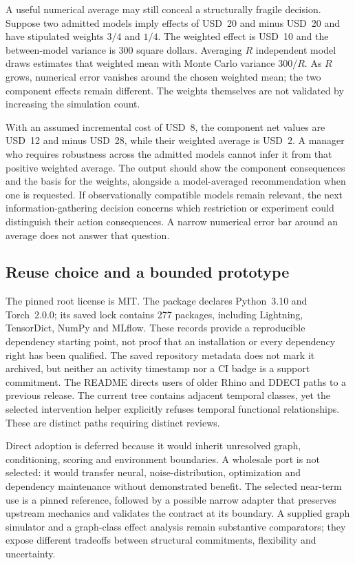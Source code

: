 A useful numerical average may still conceal a structurally fragile decision.
Suppose two admitted models imply effects of USD~20 and minus USD~20 and have
stipulated weights \(3/4\) and \(1/4\). The weighted effect is USD~10 and the
between-model variance is \(300\) square dollars. Averaging \(R\) independent
model draws estimates that weighted mean with Monte Carlo variance \(300/R\).
As \(R\) grows, numerical error vanishes around the chosen weighted mean;
the two component effects remain different. The weights themselves are not
validated by increasing the simulation count. \citep{exec14_causica_exact}

With an assumed incremental cost of USD~8, the component net values are
USD~12 and minus USD~28, while their weighted average is USD~2. A manager who
requires robustness across the admitted models cannot infer it from that
positive weighted average. The output should show the component consequences
and the basis for the weights, alongside a model-averaged recommendation
when one is requested. If observationally compatible models remain relevant,
the next information-gathering decision concerns which restriction or
experiment could distinguish their action consequences. A narrow numerical
error bar around an average does not answer that question.
\citep{exec14_causica_exact,exec14_causica_decision}

\subsection{Reuse choice and a bounded prototype}

The pinned root license is MIT. The package declares Python~3.10 and
Torch~2.0.0; its saved lock contains 277 packages, including Lightning,
TensorDict, NumPy and MLflow. These records provide a reproducible dependency
starting point, not proof that an installation or every dependency right has
been qualified. The saved repository metadata does not mark it archived,
but neither an activity timestamp nor a CI badge is a support commitment.
The README directs users of older Rhino and DDECI paths to a previous release.
The current tree contains adjacent temporal classes, yet the selected
intervention helper explicitly refuses temporal functional relationships.
These are distinct paths requiring distinct reviews.
\citep{exec14_causica_primary}

Direct adoption is deferred because it would inherit unresolved graph,
conditioning, scoring and environment boundaries. A wholesale port is not
selected: it would transfer neural, noise-distribution, optimization and
dependency maintenance without demonstrated benefit. The selected near-term
use is a pinned reference, followed by a possible narrow adapter that preserves
upstream mechanics and validates the contract at its boundary. A supplied
graph simulator and a graph-class effect analysis remain substantive
comparators; they expose different tradeoffs between structural commitments,
flexibility and uncertainty. \citep{exec14_causica_decision}


